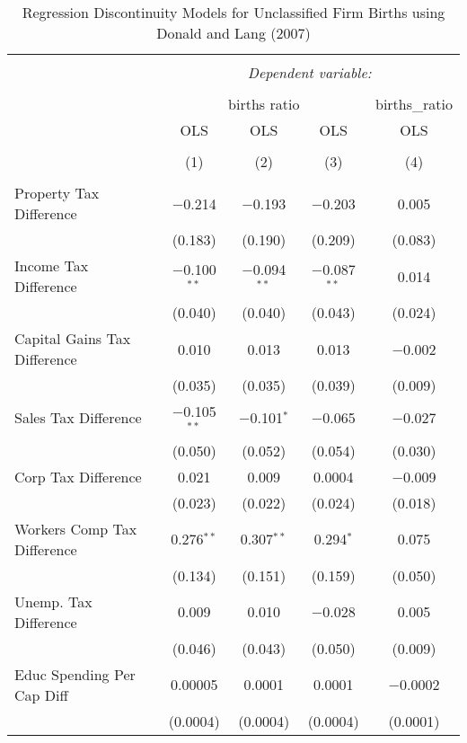 
\begin{table}[!htbp] \centering 
  \caption{Regression Discontinuity Models for  Unclassified Firm Births using Donald and Lang (2007)} 
  \label{} 
\begin{tabular}{@{\extracolsep{5pt}}lcccc} 
\\[-1.8ex]\hline 
\hline \\[-1.8ex] 
 & \multicolumn{4}{c}{\textit{Dependent variable:}} \\ 
\cline{2-5} 
\\[-1.8ex] & \multicolumn{3}{c}{births ratio} & births\_ratio \\ 
 & OLS & OLS & OLS & OLS \\ 
\\[-1.8ex] & (1) & (2) & (3) & (4)\\ 
\hline \\[-1.8ex] 
 Property Tax Difference & $-$0.214 & $-$0.193 & $-$0.203 & 0.005 \\ 
  & (0.183) & (0.190) & (0.209) & (0.083) \\ 
  Income Tax Difference & $-$0.100$^{**}$ & $-$0.094$^{**}$ & $-$0.087$^{**}$ & 0.014 \\ 
  & (0.040) & (0.040) & (0.043) & (0.024) \\ 
  Capital Gains Tax Difference & 0.010 & 0.013 & 0.013 & $-$0.002 \\ 
  & (0.035) & (0.035) & (0.039) & (0.009) \\ 
  Sales Tax Difference & $-$0.105$^{**}$ & $-$0.101$^{*}$ & $-$0.065 & $-$0.027 \\ 
  & (0.050) & (0.052) & (0.054) & (0.030) \\ 
  Corp Tax Difference & 0.021 & 0.009 & 0.0004 & $-$0.009 \\ 
  & (0.023) & (0.022) & (0.024) & (0.018) \\ 
  Workers Comp Tax Difference & 0.276$^{**}$ & 0.307$^{**}$ & 0.294$^{*}$ & 0.075 \\ 
  & (0.134) & (0.151) & (0.159) & (0.050) \\ 
  Unemp. Tax Difference & 0.009 & 0.010 & $-$0.028 & 0.005 \\ 
  & (0.046) & (0.043) & (0.050) & (0.009) \\ 
  Educ Spending Per Cap Diff & 0.00005 & 0.0001 & 0.0001 & $-$0.0002 \\ 
  & (0.0004) & (0.0004) & (0.0004) & (0.0001) \\ 

\end{tabular}
\end{table}
